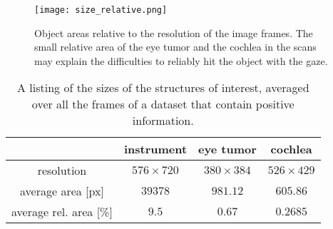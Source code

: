\begin{figure}[ht]
	\centering
	  \texttt{[image: size\_relative.png]}
	\caption{Object areas relative to the resolution of the image frames. The small relative area of the eye tumor and the cochlea in the scans may explain the difficulties to reliably hit the object with the gaze.}
	\label{fig:relativeobjectsize}
\end{figure}

\begin{table}[ht]
	\centering
	  \caption{A listing of the sizes of the structures of interest, averaged over all the frames of a dataset that contain positive information.}
	  \label{tab:avgobjectsize}
	\begin{tabular}{ | c  c  c  c | }
	\hline
				& instrument 	& eye tumor & cochlea \\ \hline
	  resolution  		& $576 \times 720$ & $380 \times 384$ & $526 \times 429$ \\ 
	  average area [px]	& $39378$ 	& $981.12$ 	 & $605.86$ \\
	  average rel. area [\%]& $9.5$ 		& $0.67$ 		 & $0.2685$ \\ \hline
	\end{tabular}
\end{table}

